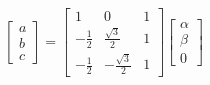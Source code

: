 \begin{gather}
\label{eq:inv_clark}
    \begin{bmatrix}
     a \\ b \\ c
    \end{bmatrix}
    =
    \begin{bmatrix}
    1            & 0                  & 1             \\[0.5em]
    -\frac{1}{2} & \frac{\sqrt{3}}{2} & 1             \\[0.5em]
    -\frac{1}{2} & -\frac{\sqrt{3}}{2}& 1
    \end{bmatrix}
    \begin{bmatrix}
     \alpha \\ \beta \\ 0
    \end{bmatrix}
\end{gather}